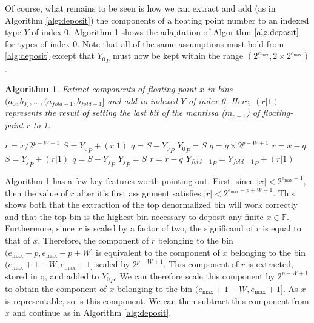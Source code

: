 \documentclass[12pt]{article}
\providecommand{\F}{\ensuremath{\mathbb{F}}}
\providecommand{\max}{\ensuremath{\text{max}}}
\providecommand{\To}{\ensuremath{\text{ to }}}
\theoremstyle{plain}
\newtheorem{alg}{Algorithm}[section]
\numberwithin{equation}{section}
\begin{document}
      Of course, what remains to be seen is how we can extract and add (as in Algorithm \ref{alg:deposit}) the components of a floating point number to an indexed type $Y$ of index 0. Algorithm \ref{alg:deposit0} shows the adaptation of Algorithm $\ref{alg:deposit}$ for types of index 0. Note that all of the same assumptions must hold from \ref{alg:deposit} except that ${Y_0}_P$ must now be kept within the range $(2^{e_{\max}}, 2 \times 2^{e_{\max}})$.
      \begin{alg}
        Extract components of floating point $x$ in bins $(a_0, b_0], ..., (a_{fold - 1}, b_{fold - 1}]$ and add to indexed $Y$ of index 0. Here, $(r | 1)$ represents the result of setting the last bit of the mantissa ($m_{p - 1}$) of floating-point $r$ to 1.
        \begin{algorithmic}[1]
            \State $r = x / 2^{p - W + 1}$
            \State $S = {Y_0}_P + (r | 1)$
            \State $q = S - {Y_0}_P$
            \State ${Y_0}_P = S$
            \State $q = q \times 2^{p - W + 1}$
            \State $r = x - q$
            \For{$j = 1 \To (fold - 2)$}
              \State $S = {Y_j}_P + (r | 1)$
              \State $q = S - {Y_j}_P$
              \State ${Y_j}_P = S$
              \State $r = r - q$
            \EndFor
            \State ${Y_{fold - 1}}_P = {Y_{fold - 1}}_P + (r | 1)$
          \EndFunction
        \end{algorithmic}
        \label{alg:deposit0}
      \end{alg}

      Algorithm \ref{alg:deposit0} has a few key features worth pointing out. First, since $|x| < 2^{e_{\max} + 1}$, then the value of $r$ after it's first assignment satisfies $|r| < 2^{e_{\max} - p + W + 1}$. This shows both that the extraction of the top denormalized bin will work correctly and that the top bin is the highest bin necessary to deposit any finite $x \in \F$.
      Furthermore, since $x$ is scaled by a factor of two, the significand of $r$ is equal to that of $x$.
      Therefore, the component of $r$ belonging to the bin $(e_{\max} - p, e_{\max} - p + W]$ is equivalent to the component of $x$ belonging to the bin $(e_{\max} + 1 - W, e_{\max} + 1]$ scaled by $2^{p - W + 1}$. This component of $r$ is extracted, stored in q, and added to ${Y_0}_P$. We can therefore scale this component by $2^{p - W + 1}$ to obtain the component of $x$ belonging to the bin $(e_{\max} + 1 - W, e_{\max} + 1]$. As $x$ is representable, so is this component. We can then subtract this component from $x$ and continue as in Algorithm \ref{alg:deposit}.
\end{document}
